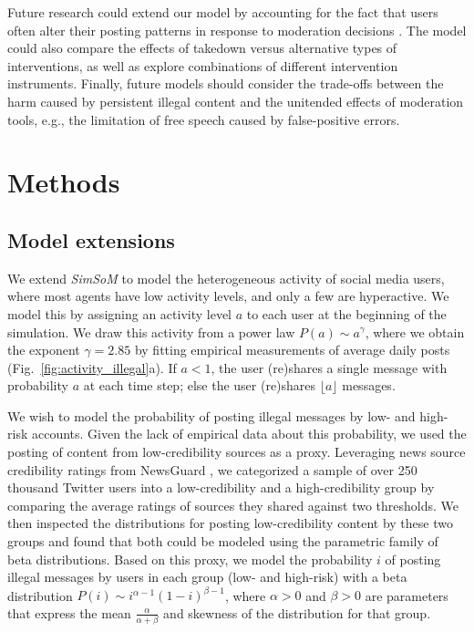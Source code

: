\documentclass{article}
\newcommand{\simsom}{\emph{SimSoM}}
\begin{document}
Future research could extend our model by accounting for the fact that users often alter their posting patterns in response to moderation decisions \cite{srinivasan2019content, jhaver2019does}.  
The model could also compare the effects of takedown versus alternative types of interventions, as well as explore combinations of different intervention instruments. 
Finally, future models should consider the trade-offs between the harm caused by persistent illegal content and the unitended effects of moderation tools, e.g., the limitation of free speech caused by false-positive errors.

\section*{Methods}
\label{sec:methods}

\subsection*{Model extensions}

We extend \simsom{} to model the heterogeneous activity of social media users, where most agents have low activity levels, and only a few are hyperactive. We model this by assigning an activity level $a$ to each user at the beginning of the simulation. We draw this activity from a power law $P(a) \sim a^{\gamma}$, where we obtain the exponent $\gamma = 2.85$ by fitting empirical measurements of average daily posts (Fig.~\ref{fig:activity_illegal}a).  
If $a<1$, the user (re)shares a single message with probability $a$ at each time step; else the user (re)shares $\lfloor a \rfloor$ messages. 


We wish to model the probability of posting illegal messages by low- and high-risk accounts. Given the lack of empirical data about this probability, we used the posting of content from low-credibility sources as a proxy. Leveraging news source credibility ratings from NewsGuard \cite{Newsguard_2025}, we categorized a sample of over 250 thousand Twitter users into a low-credibility and a high-credibility group by comparing the average ratings of sources they shared against two thresholds. 
We then inspected the distributions for posting low-credibility content by these two groups and found that both could be modeled using the parametric family of beta distributions. 
Based on this proxy, we model the probability $i$ of posting illegal messages by users in each group (low- and high-risk) with a beta distribution $P(i) \sim i^{\alpha-1}(1-i)^{\beta-1}$, where $\alpha>0$ and $\beta>0$ are parameters that express the mean $\frac{\alpha}{\alpha + \beta}$ and skewness of the distribution for that group. 
\end{document}
